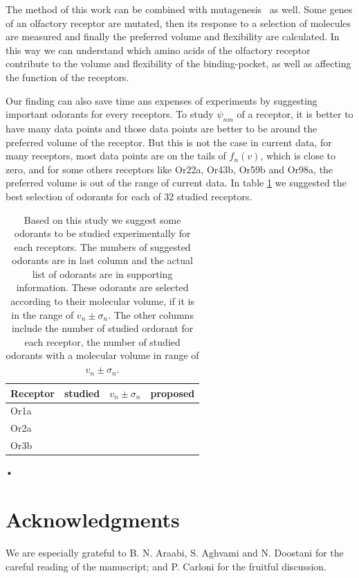 \documentclass[11pt]{paper} %
\newcommand{\numberofreceptors}{32 }
\begin{document}
The method of this work can be combined with mutagenesis~\cite{} as well. 
Some genes of an olfactory receptor are mutated, 
then its response to a selection of molecules are measured and finally the preferred volume and flexibility are calculated.
In this way we can understand which amino acids of the olfactory receptor contribute to the volume and flexibility of the binding-pocket, 
as well as affecting the function of the receptors.

Our finding can also save time ans expenses of experiments by suggesting important odorants for every receptors.
To study $\psi_{nm}$ of a receptor, it is better to have many data points and those data points are better to be around the preferred volume of the receptor.
But this is not the case in current data, 
for many receptors, most data points are on the tails of $f_n(v)$, which is close to zero,
and for some others receptors like Or22a, Or43b, Or59b and Or98a, 
the preferred volume is out of the range of current data.
In table \ref{tab:receptor-odorant} we suggested the best selection of odorants for each of \numberofreceptors studied receptors.

\begin{table}
\centering
	\begin{tabular}{|l|r|r|r|}
		\hline 
		Receptor & studied & $v_n \pm \sigma_n$ & proposed\\ \hline 
		Or1a & & & \\
		Or2a & & & \\
		Or3b & & & \\	\hline
	\end{tabular}
	\caption{Based on this study we suggest some odorants to be studied experimentally for each receptors. 		
		The numbers of suggested odorants are in last column and the actual list of odorants are in supporting information.
		These odorants are selected according to their molecular volume, if it is in the range of $v_n \pm \sigma_n$.
		The other columns include the number of studied ordorant for each receptor, 
		the number of studied odorants with a molecular volume in range of $v_n \pm \sigma_n$.}
	\label{tab:receptor-odorant}
\end{table}•

\section{Acknowledgments}
We are especially grateful to B. N. Araabi, S. Aghvami and N. Doostani for the careful reading of the manuscript; and P. Carloni for the fruitful discussion.

\printbibliography
\end{document}
